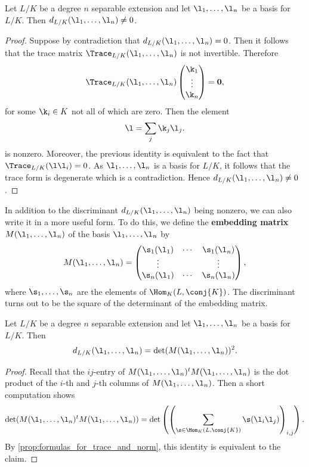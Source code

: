 \documentclass[12pt]{article}
\begin{document}
      \begin{proposition}\label{prop:discriminant_not_zero}
        Let \(L/K\) be a degree \(n\) separable extension and let \(\l_{1},\ldots,\l_{n}\) be a basis for \(L/K\). Then \(d_{L/K}(\l_{1},\ldots,\l_{n}) \neq 0\).
      \end{proposition}
      \begin{proof}
        Suppose by contradiction that \(d_{L/K}(\l_{1},\ldots,\l_{n}) = 0\). Then it follows that the trace matrix \(\Trace_{L/K}(\l_{1},\ldots,\l_{n})\) is not invertible. Therefore
        \[
          \Trace_{L/K}(\l_{1},\ldots,\l_{n})\begin{pmatrix} \k_{1} \\ \vdots \\ \k_{n} \end{pmatrix} = \mathbf{0},
        \]
        for some \(\k_{i} \in K\) not all of which are zero. Then the element
        \[
          \l = \sum_{j}\k_{j}\l_{j}.
        \]
        is nonzero. Moreover, the previous identity is equivalent to the fact that \(\Trace_{L/K}(\l\l_{i}) = 0\). As \(\l_{1},\ldots,\l_{n}\) is a basis for \(L/K\), it follows that the trace form is degenerate which is a contradiction. Hence \(d_{L/K}(\l_{1},\ldots,\l_{n}) \neq 0\).
      \end{proof}

      In addition to the discriminant \(d_{L/K}(\l_{1},\ldots,\l_{n})\) being nonzero, we can also write it in a more useful form. To do this, we define the \textbf{embedding matrix} \(M(\l_{1},\ldots,\l_{n})\) of the basis \(\l_{1},\ldots,\l_{n}\) by
      \[
        M(\l_{1},\ldots,\l_{n}) = \begin{pmatrix} \s_{1}(\l_{1}) & \cdots & \s_{1}(\l_{n}) \\ \vdots & & \vdots \\ \s_{n}(\l_{1}) & \cdots & \s_{n}(\l_{n}) \end{pmatrix},
      \]
      where \(\s_{1},\ldots,\s_{n}\) are the elements of \(\Hom_{K}(L,\conj{K})\). The discriminant turns out to be the square of the determinant of the embedding matrix.

      \begin{proposition}\label{disc_as_square_of_embedding_matrix}
        Let \(L/K\) be a degree \(n\) separable extension and let \(\l_{1},\ldots,\l_{n}\) be a basis for \(L/K\). Then
        \[
          d_{L/K}(\l_{1},\ldots,\l_{n}) = \det(M(\l_{1},\ldots,\l_{n}))^{2}.
        \]
      \end{proposition}
      \begin{proof}
        Recall that the \(ij\)-entry of \(M(\l_{1},\ldots,\l_{n})^{t}M(\l_{1},\ldots,\l_{n})\) is the dot product of the \(i\)-th and \(j\)-th columns of \(M(\l_{1},\ldots,\l_{n})\). Then a short computation shows
        \[
          \det(M(\l_{1},\ldots,\l_{n})^{t}M(\l_{1},\ldots,\l_{n})) = \det\left(\left(\sum_{\s \in \Hom_{K}(L,\conj{K})}\s(\l_{i}\l_{j})\right)_{i,j}\right).
        \]
        By \cref{prop:formulas_for_trace_and_norm}, this identity is equivalent to the claim.
      \end{proof}
\end{document}
